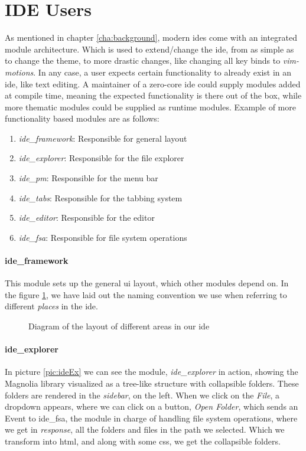 \section{IDE Users}

As mentioned in chapter \ref{cha:background}, modern \gls*{ide}s come with an
integrated module architecture. Which is used to extend/change the \gls*{ide},
from as simple as to change the theme, to more drastic changes, like changing
all key binds to \textit{vim-motions}. In any case, a user expects certain
functionality to already exist in an \gls*{ide}, like text editing. A maintainer
of a zero-core \gls*{ide} could supply modules added at compile time, meaning the
expected functionality is there out of the box, while more thematic modules
could be supplied as runtime modules. Example of more functionality based
modules are as follows:

\begin{enumerate}
  \item \textit{ide\_framework}: Responsible for general layout
  \item \textit{ide\_explorer}: Responsible for the file explorer
  \item \textit{ide\_pm}: Responsible for the menu bar
  \item \textit{ide\_tabs}: Responsible for the tabbing system
  \item \textit{ide\_editor}: Responsible for the editor
  \item \textit{ide\_fsa}: Responsible for file system operations
\end{enumerate}

\paragraph{ide\_framework} This module sets up the general \gls*{ui} layout,
which other modules depend on. In the figure \ref{fig:ideLayout}, we have laid
out the naming convention we use when referring to different \textit{places} in
the \gls*{ide}.

\begin{figure}[H]
  \centering
  
  \caption{
    Diagram of the layout of different areas in our \gls*{ide}
  }
  \label{fig:ideLayout}
\end{figure}

\paragraph{ide\_explorer} In picture \ref{pic:ideEx} we can see the
module, \textit{ide\_explorer} in action, showing the Magnolia library
visualized as a tree-like structure with collapsible folders. These folders are
rendered in the \textit{sidebar}, on the left. When we click on the
\textit{File}, a dropdown appears, where we can click on a button,
\textit{Open Folder}, which sends an Event to ide\_fsa, the module in
charge of handling file system operations, where we get in \textit{response},
all the folders and files in the path we selected. Which we transform into
\gls*{html}, and along with some \gls*{css}, we get the collapsible folders.

